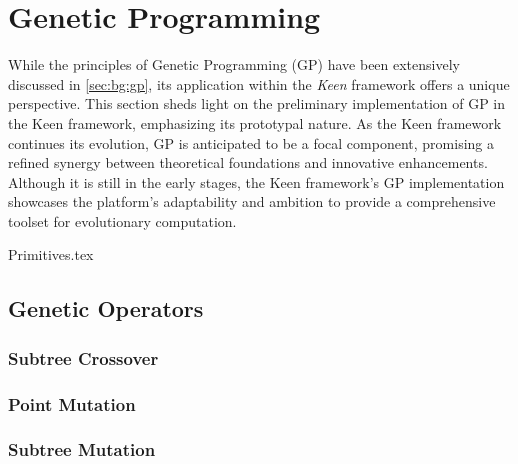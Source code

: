 
\section{Genetic Programming}
\label{sec:keen:gp}
  While the principles of Genetic Programming (GP) have been extensively 
  discussed in \vref{sec:bg:gp}, its application within the \textit{Keen} 
  framework offers a unique perspective. This section sheds light on the 
  preliminary implementation of GP in the Keen framework, emphasizing its 
  prototypal nature. As the Keen framework continues its evolution, GP is 
  anticipated to be a focal component, promising a refined synergy between 
  theoretical foundations and innovative enhancements. Although it is still in 
  the early stages, the Keen framework's GP implementation showcases the 
  platform's adaptability and ambition to provide a comprehensive toolset for 
  evolutionary computation.

  {Primitives.tex}

  \subsection{Genetic Operators}
  \label{sec:keen:gp:op}

  \subsubsection{Subtree Crossover}
  \label{sec:keen:gp:op:cx:subtree}
  \Blindtext

  \subsubsection{Point Mutation}
  \label{sec:keen:gp:op:mutation:point}
  \Blindtext

  \subsubsection{Subtree Mutation}
  \label{sec:keen:op:mut:subtree}
  \Blindtext